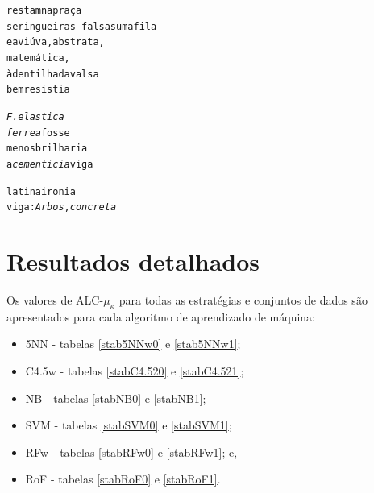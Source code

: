 \documentclass[doutorado, pos-defesa, spanish, english, brazil, versalete, sumario=tradicional]{packages/icmc}
\begin{document}
\begin{anexosenv}
\begin{alltt}
               restam na praça               
               seringueiras-falsas    uma fila
               e a viúva, abstrata,
              matemática, 
              à dentilhada valsa
              bem resistia

              \textit{F. elastica}
              \textit{ferrea} fosse
              menos brilharia
              a \textit{cementicia} viga

              latina ironia
              viga: \textit{Arbos},     \textit{concreta}  
\end{alltt}




\chapter{Resultados detalhados} \label{anresdet}
Os valores de ALC-$\mu_\kappa$ para todas as estratégias e conjuntos de dados são apresentados para cada algoritmo de aprendizado de máquina:
\begin{itemize}
   \item 5NN - tabelas \ref{stab5NNw0} e \ref{stab5NNw1};
   \item C4.5w - tabelas \ref{stabC4.520} e \ref{stabC4.521};
   \item NB - tabelas \ref{stabNB0} e \ref{stabNB1};
   \item SVM - tabelas \ref{stabSVM0} e \ref{stabSVM1};
   \item RFw - tabelas \ref{stabRFw0} e \ref{stabRFw1}; e,
   \item RoF - tabelas \ref{stabRoF0} e \ref{stabRoF1}.
\end{itemize}


\end{anexosenv}
\end{document}
